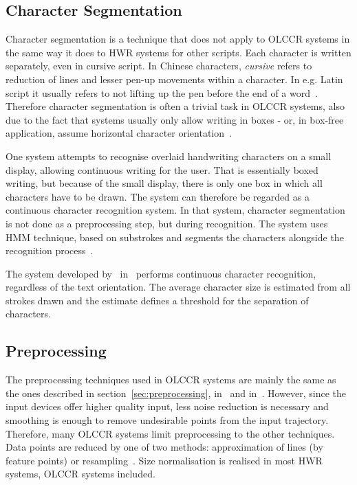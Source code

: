 \subsection{Character Segmentation}
\label{sec:olccr:charactersegmentation}

Character segmentation is a technique that does not apply to OLCCR systems in
the same way it does to HWR systems for other scripts. Each character is
written separately, even in cursive script. In Chinese characters, \emph{cursive}
refers to reduction of lines and lesser pen-up movements within a character.
In e.g. Latin script it usually refers to not lifting up the pen before the end
of a word~. Therefore character segmentation is often a
trivial task in OLCCR systems, also due to the fact that systems usually only
allow writing in boxes - or, in box-free application, assume horizontal 
character orientation~.

One system attempts to recognise overlaid handwriting characters on a small 
display, allowing continuous writing for the user. That is essentially boxed
writing, but because of the small display, there is only one box in which 
all characters have to be drawn. The system can therefore be regarded as a
continuous character recognition system. In that system, character segmentation 
is not done as a preprocessing step, but during recognition. The system uses 
HMM technique, based on substrokes and segments the characters alongside the 
recognition process~.

The system developed by~ in~
performs continuous character recognition, regardless of the text orientation.
The average character size is estimated from all strokes drawn and the estimate
defines a threshold for the separation of characters.

\subsection{Preprocessing}
\label{sec:olccr:preprocessing}

The preprocessing techniques used in OLCCR systems are mainly the same as the
ones described in section~\ref{sec:preprocessing}, in~
and in~. However, since the input devices offer higher 
quality input, less noise reduction is necessary and smoothing is enough to 
remove undesirable points from the input trajectory. Therefore, many OLCCR 
systems limit preprocessing to the other techniques. Data points are reduced
by one of two methods: approximation of lines (by feature points) or 
resampling~.
Size normalisation is realised in most HWR systems, OLCCR systems included.

